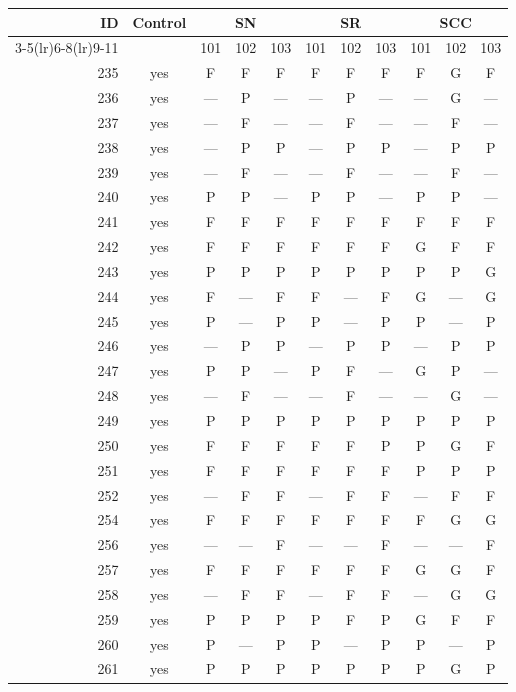 \begin{table}[p]\centering\small
\begin{tabular*}{\textwidth}{@{\extracolsep{\fill}}rc*{9}{c}@{}}\toprule
ID & Control & \multicolumn{3}{c}{SN} & \multicolumn{3}{c}{SR} & \multicolumn{3}{c}{SCC}\\
\cmidrule(lr){3-5}\cmidrule(lr){6-8}\cmidrule(lr){9-11}
 & & 101 & 102 & 103 & 101 & 102 & 103 & 101 & 102 & 103\\\midrule
235 & yes & F & F & F & F & F & F & F & G & F\\
236 & yes & — & P & — & — & P & — & — & G & —\\
237 & yes & — & F & — & — & F & — & — & F & —\\
238 & yes & — & P & P & — & P & P & — & P & P\\
239 & yes & — & F & — & — & F & — & — & F & —\\
240 & yes & P & P & — & P & P & — & P & P & —\\
241 & yes & F & F & F & F & F & F & F & F & F\\
242 & yes & F & F & F & F & F & F & G & F & F\\
243 & yes & P & P & P & P & P & P & P & P & G\\
244 & yes & F & — & F & F & — & F & G & — & G\\
245 & yes & P & — & P & P & — & P & P & — & P\\
246 & yes & — & P & P & — & P & P & — & P & P\\
247 & yes & P & P & — & P & F & — & G & P & —\\
248 & yes & — & F & — & — & F & — & — & G & —\\
249 & yes & P & P & P & P & P & P & P & P & P\\
250 & yes & F & F & F & F & F & P & P & G & F\\
251 & yes & F & F & F & F & F & F & P & P & P\\
252 & yes & — & F & F & — & F & F & — & F & F\\
254 & yes & F & F & F & F & F & F & F & G & G\\
256 & yes & — & — & F & — & — & F & — & — & F\\
257 & yes & F & F & F & F & F & F & G & G & F\\
258 & yes & — & F & F & — & F & F & — & G & G\\
259 & yes & P & P & P & P & F & P & G & F & F\\
260 & yes & P & — & P & P & — & P & P & — & P\\
261 & yes & P & P & P & P & P & P & P & G & P\\

\end{tabular*}
\end{table}
